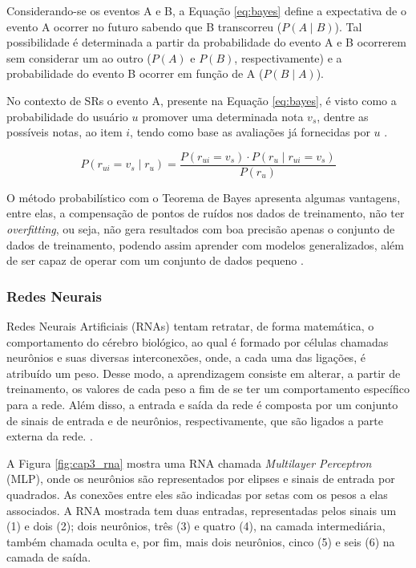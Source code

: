         Considerando-se os eventos A e B, a Equação \ref{eq:bayes} define a expectativa de o evento A ocorrer no futuro sabendo que B transcorreu ($P(A \mid B)$). Tal possibilidade é determinada a partir da probabilidade do evento A e B ocorrerem sem considerar um ao outro ($P(A)$ e $P(B)$, respectivamente) e a probabilidade do evento B ocorrer em função de A ($P (B \mid A)$).
        
        No contexto de SRs o evento A, presente na Equação \ref{eq:bayes}, é visto como a probabilidade do usuário $u$ promover uma determinada nota $v_s$, dentre as possíveis notas, ao item $i$, tendo como base as avaliações já fornecidas por $u$ \cite{Aggarwal2016}.
        
        \begin{equation}
              P(r_{ui} = v_s \mid r_u) = \frac{P(r_{ui}=v_s) \cdot P(r_u \mid r_{ui} = v_s)}{P(r_u)}
        \end{equation}
        
        O método probabilístico com o Teorema de Bayes apresenta algumas vantagens, entre elas, a compensação de pontos de ruídos nos dados de treinamento, não ter \textit{overfitting}, ou seja, não gera resultados com boa precisão apenas o conjunto de dados de treinamento, podendo assim aprender com modelos generalizados, além de ser capaz de operar com um conjunto de dados pequeno \cite{Jannach2010}.
        
        \ProximoForaDoSumario
        \subsubsection{Redes Neurais}
        
        Redes Neurais Artificiais (RNAs) tentam retratar, de forma matemática, o comportamento do cérebro biológico, ao qual é formado por células chamadas neurônios e suas diversas interconexões, onde, a cada uma das ligações, é atribuído um peso. Desse modo, a aprendizagem consiste em alterar, a partir de treinamento, os valores de cada peso a fim de se ter um comportamento específico para a rede. Além disso, a entrada e saída da rede é composta por um conjunto de sinais de entrada e de neurônios, respectivamente, que são ligados a parte externa da rede. \cite{Russell2009}. 
        
        A Figura \ref{fig:cap3_rna} mostra uma RNA chamada \textit{Multilayer Perceptron} (MLP), onde os neurônios são representados por elipses e sinais de entrada por quadrados. As conexões entre eles são indicadas por setas com os pesos a elas associados. A RNA mostrada tem duas entradas, representadas pelos sinais um (1) e dois (2); dois neurônios, três (3) e quatro (4), na camada intermediária, também chamada oculta e, por fim, mais dois neurônios, cinco (5) e seis (6) na camada de saída.
        
